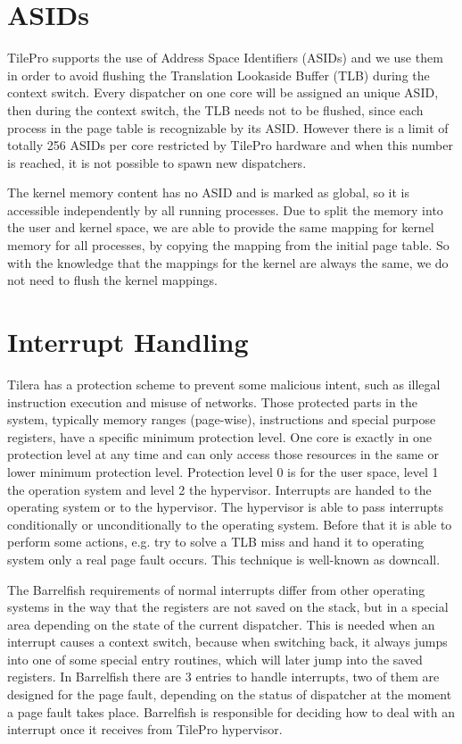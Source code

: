 \documentclass[a4paper,twoside]{report} %
\begin{document}
\section{ASIDs}
TilePro supports the use of Address Space Identifiers (ASIDs) and we use them in order to avoid flushing the Translation Lookaside Buffer (TLB) during the context switch. Every dispatcher on one core will be assigned an unique ASID, then during the context switch, the TLB needs not to be flushed, since each process in the page table is recognizable by its ASID. However there is a limit of totally 256 ASIDs per core restricted by TilePro hardware and when this number is reached, it is not possible to spawn new dispatchers.

The kernel memory content has no ASID and is marked as global, so it is accessible independently by all running processes. Due to split the memory into the user and kernel space, we are able to provide the same mapping for kernel memory for all processes, by copying the mapping from the initial page table. So with the knowledge that the mappings for the kernel are always the same, we do not need to flush the kernel mappings.

\section{Interrupt Handling}
Tilera has a protection scheme to prevent some malicious intent, such as illegal instruction execution and misuse of networks. Those protected parts in the system, typically memory ranges (page-wise), instructions and special purpose registers, have a specific minimum protection level. One core is exactly in one protection level at any time and can only access those resources in the same or lower minimum protection level. Protection level 0 is for the user space, level 1 the operation system and level 2 the hypervisor. Interrupts are handed to the operating system or to the hypervisor. The hypervisor is able to pass interrupts conditionally or unconditionally to the operating system. Before that it is able to perform some actions, e.g. try to solve a TLB miss and hand it to operating system only a real page fault occurs. This technique is well-known as downcall.

The Barrelfish requirements of normal interrupts differ from other operating systems in the way that the registers are not saved on the stack, but in a special area depending on the state of the current dispatcher. This is needed when an interrupt causes a context switch, because when switching back, it always jumps into one of some special entry routines, which will later jump into the saved registers. In Barrelfish there are 3 entries to handle interrupts, two of them are designed for the page fault, depending on the status of dispatcher at the moment a page fault takes place. Barrelfish is responsible for deciding how to deal with an interrupt once it receives from TilePro hypervisor.
\end{document}
